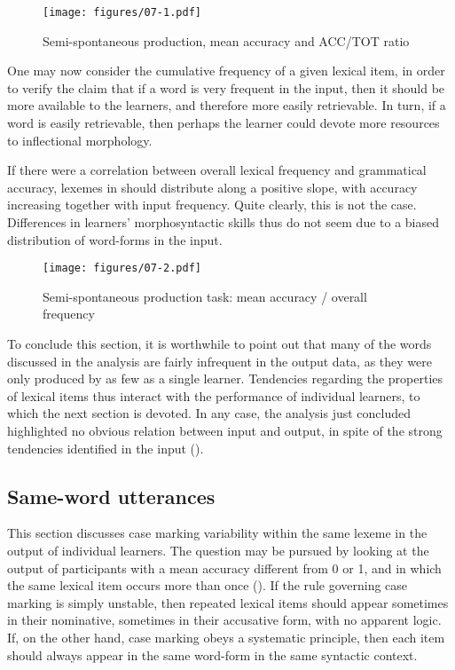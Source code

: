 \begin{figure}
    \texttt{[image: figures/07-1.pdf]}
    \caption{Semi-spontaneous production, mean accuracy and ACC/TOT ratio}
    \label{fig:07:1}
\end{figure}

One may now consider the cumulative frequency of a given lexical item, in order to verify the claim that if a word is very frequent in the input, then it should be more available to the learners, and therefore more easily retrievable. In turn, if a word is easily retrievable, then perhaps the learner could devote more resources to inflectional morphology. 

If there were a correlation between overall lexical frequency and grammatical accuracy, lexemes in  should distribute along a positive slope, with accuracy increasing together with input frequency. Quite clearly, this is not the case. Differences in learners' morphosyntactic skills thus do not seem due to a biased distribution of word-forms in the input. 

\begin{figure}
    \texttt{[image: figures/07-2.pdf]}
    \caption{Semi-spontaneous production task: mean accuracy / overall frequency}
    \label{fig:07:2}
\end{figure}

To conclude this section, it is worthwhile to point out that many of the words discussed in the analysis are fairly infrequent in the output data, as they were only produced by as few as a single learner. Tendencies regarding the properties of lexical items thus interact with the performance of individual learners, to which the next section is devoted. In any case, the analysis just concluded highlighted no obvious relation between input and output, in spite of the strong tendencies identified in the input ().

\subsection{Same-word utterances}\label{sec:07:2.2}

This section discusses case marking variability within the same lexeme in the output of individual learners. The question may be pursued by looking at the output of participants with a mean accuracy different from 0 or 1, and in which the same lexical item occurs more than once (). If the rule governing case marking is simply unstable, then repeated lexical items should appear sometimes in their nominative, sometimes in their accusative form, with no apparent logic. If, on the other hand, case marking obeys a systematic principle, then each item should always appear in the same word-form in the same syntactic context.

